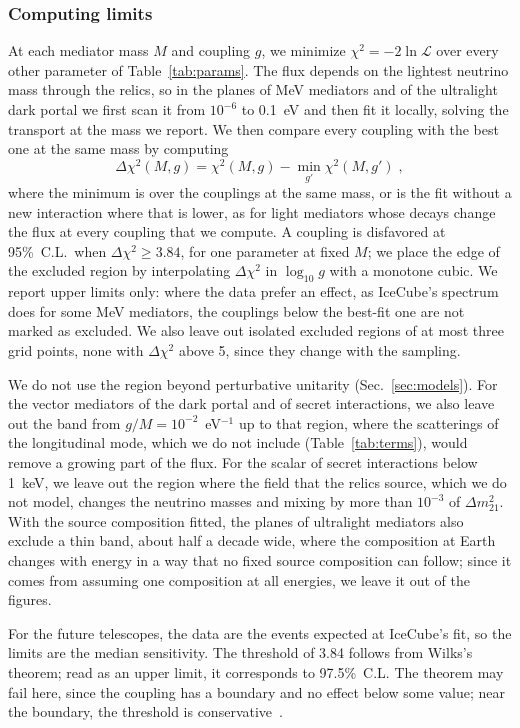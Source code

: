 \documentclass[linenumbers, aps, prd, twocolumn, superscriptaddress, floatfix, longbibliography, nofootinbib, bibnotes]{revtex4-2}
\begin{document}
\subsubsection{Computing limits}
At each mediator mass $M$ and coupling $g$, we minimize $\chi^2 = -2\ln\mathcal{L}$ over every other parameter of Table~\ref{tab:params}.
The flux depends on the lightest neutrino mass through the relics, so in the planes of MeV mediators and of the ultralight dark portal we first scan it from $10^{-6}$ to 0.1~eV and then fit it locally, solving the transport at the mass we report.
We then compare every coupling with the best one at the same mass by computing
\begin{equation}
 \label{equ:dchi2}
 \Delta\chi^2(M, g) = \chi^2(M, g) - \min_{g'} \chi^2(M, g') \;,
\end{equation}
where the minimum is over the couplings at the same mass, or is the fit without a new interaction where that is lower, as for light mediators whose decays change the flux at every coupling that we compute.
A coupling is disfavored at 95\%~C.L.\ when $\Delta\chi^2 \geq 3.84$, for one parameter at fixed $M$; we place the edge of the excluded region by interpolating $\Delta\chi^2$ in $\log_{10} g$ with a monotone cubic.
We report upper limits only: where the data prefer an effect, as IceCube's spectrum does for some MeV mediators, the couplings below the best-fit one are not marked as excluded.
We also leave out isolated excluded regions of at most three grid points, none with $\Delta\chi^2$ above 5, since they change with the sampling.

We do not use the region beyond perturbative unitarity (Sec.~\ref{sec:models}).
For the vector mediators of the dark portal and of secret interactions, we also leave out the band from $g/M = 10^{-2}$~eV$^{-1}$ up to that region, where the scatterings of the longitudinal mode, which we do not include (Table~\ref{tab:terms}), would remove a growing part of the flux.
For the scalar of secret interactions below 1~keV, we leave out the region where the field that the relics source, which we do not model, changes the neutrino masses and mixing by more than $10^{-3}$ of $\Delta m^2_{21}$.
With the source composition fitted, the planes of ultralight mediators also exclude a thin band, about half a decade wide, where the composition at Earth changes with energy in a way that no fixed source composition can follow; since it comes from assuming one composition at all energies, we leave it out of the figures.

For the future telescopes, the data are the events expected at IceCube's fit, so the limits are the median sensitivity.
The threshold of 3.84 follows from Wilks's theorem; read as an upper limit, it corresponds to 97.5\%~C.L.
The theorem may fail here, since the coupling has a boundary and no effect below some value; near the boundary, the threshold is conservative~\cite{Cowan:2010js}.
\end{document}
